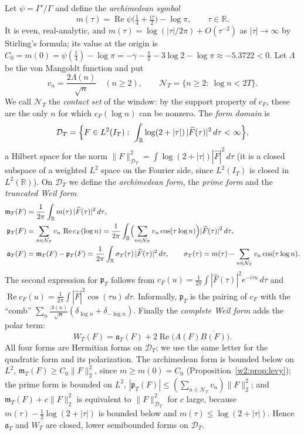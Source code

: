\documentclass[11pt]{amsart}
\theoremstyle{definition}
\theoremstyle{remark}
\numberwithin{equation}{section}
\newcommand{\R}{\mathbb{R}}
\DeclareMathOperator{\Rel}{Re}
\newcommand{\IT}{I_T}                                  %
\newcommand{\Fh}{\widehat F}                           %
\newcommand{\cF}{c_F}                                  %
\newcommand{\DT}{\mathcal{D}_T}                        %
\newcommand{\NT}{\mathcal{N}_T}                        %
\newcommand{\mT}{\mathfrak{m}_T}                       %
\newcommand{\pT}{\mathfrak{p}_T}                       %
\newcommand{\aT}{\mathfrak{a}_T}                       %
\newcommand{\WT}{W_T}                                  %
\newcommand{\sT}{\sigma_T}                             %
\begin{document}
Let $\psi=\Gamma'/\Gamma$ and define the \emph{archimedean symbol}
\begin{equation}\label{w1:eq:symbol-m}
  m(\tau)=\Rel\psi\bigl(\tfrac14+\tfrac{i\tau}2\bigr)-\log\pi ,\qquad
  \tau\in\R .
\end{equation}
It is even, real-analytic, and $m(\tau)=\log(|\tau|/2\pi)+O(\tau^{-2})$ as
$|\tau|\to\infty$ by Stirling's formula; its value at the origin is
$C_0=m(0)=\psi(\tfrac14)-\log\pi=-\gamma-\tfrac\pi2-3\log2-\log\pi\approx-5.3722<0$.
Let $\Lambda$ be the von Mangoldt function and put
\begin{equation}\label{w1:eq:weights}
  v_n=\frac{2\Lambda(n)}{\sqrt n}\quad(n\ge2),\qquad
  \NT=\{n\ge2:\ \log n<2T\}.
\end{equation}
We call $\NT$ the \emph{contact set} of the window: by the support property of
$\cF$, these are the only $n$ for which $\cF(\log n)$ can be nonzero.
The \emph{form domain} is
\[
  \DT=\Bigl\{F\in L^2(\IT):\ \int_\R\log(2+|\tau|)\,|\Fh(\tau)|^2\,d\tau<\infty\Bigr\},
\]
a Hilbert space for the norm
$\|F\|_{\DT}^2=\int\log(2+|\tau|)|\Fh|^2\,d\tau$ (it is a closed subspace of
a weighted $L^2$ space on the Fourier side, since $L^2(\IT)$ is closed in
$L^2(\R)$). On $\DT$ we define the \emph{archimedean form}, the \emph{prime
form} and the \emph{truncated Weil form}
\begin{align}
  \mT(F)&=\frac1{2\pi}\int_\R m(\tau)\,|\Fh(\tau)|^2\,d\tau,\label{w1:eq:arch}\\
  \pT(F)&=\sum_{n\in\NT}v_n\,\Rel\cF(\log n)
         =\frac1{2\pi}\int_\R\Bigl(\sum_{n\in\NT}v_n\cos(\tau\log n)\Bigr)|\Fh(\tau)|^2\,d\tau,\label{w1:eq:prime}\\
  \aT(F)&=\mT(F)-\pT(F)=\frac1{2\pi}\int_\R\sT(\tau)\,|\Fh(\tau)|^2\,d\tau,
  \qquad \sT(\tau)=m(\tau)-\sum_{n\in\NT}v_n\cos(\tau\log n).\label{w1:eq:trunc}
\end{align}
The second expression for $\pT$ follows from
$\cF(u)=\frac1{2\pi}\int|\Fh(\tau)|^2e^{-i\tau u}\,d\tau$ and
$\Rel\cF(u)=\frac1{2\pi}\int|\Fh|^2\cos(\tau u)\,d\tau$. Informally, $\pT$ is
the pairing of $\cF$ with the ``comb'' $\sum_{n}\frac{\Lambda(n)}{\sqrt n}(\delta_{\log n}+\delta_{-\log n})$.
Finally the \emph{complete Weil form} adds the polar term:
\begin{equation}\label{w1:eq:complete}
  \WT(F)=\aT(F)+2\Rel\bigl(A(F)\overline{B(F)}\bigr).
\end{equation}
All four forms are Hermitian forms on $\DT$; we use the same letter for the
quadratic form and its polarization. The archimedean form is bounded below
on $L^2$, $\mT(F)\ge C_0\|F\|_2^2$, since $m\ge m(0)=C_0$
(Proposition~\ref{w2:prop:levy}); the prime form is bounded on $L^2$,
$|\pT(F)|\le(\sum_{n\in\NT}v_n)\|F\|_2^2$; and $\mT(F)+c\|F\|_2^2$
is equivalent to $\|F\|_{\DT}^2$ for $c$ large, because
$m(\tau)-\frac12\log(2+|\tau|)$ is bounded below and $m(\tau)\le\log(2+|\tau|)$.
Hence $\aT$ and $\WT$ are closed, lower semibounded forms on $\DT$.
\end{document}
